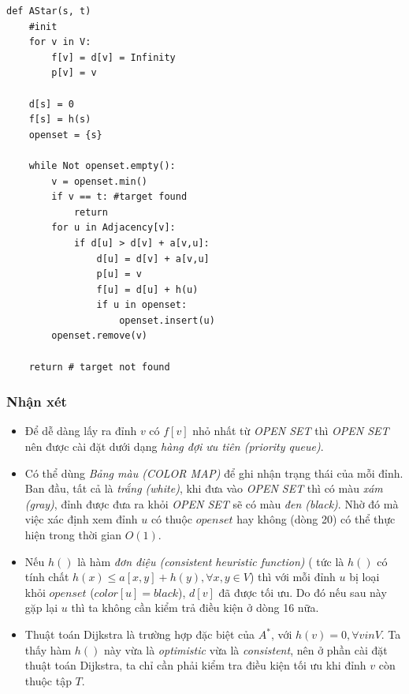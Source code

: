 \documentclass[a4paper,12pt]{report}
\begin{document}
\begin{verbatim}
def AStar(s, t)
    #init
    for v in V:
        f[v] = d[v] = Infinity
        p[v] = v

    d[s] = 0
    f[s] = h(s)
    openset = {s}

    while Not openset.empty():
        v = openset.min()
        if v == t: #target found
            return
        for u in Adjacency[v]:
            if d[u] > d[v] + a[v,u]:
                d[u] = d[v] + a[v,u]
                p[u] = v
                f[u] = d[u] + h(u)
                if u in openset:
                    openset.insert(u)
        openset.remove(v)

    return # target not found
\end{verbatim}

    \subsubsection{Nhận xét}
\begin{itemize}
    \item Để dễ dàng lấy ra đỉnh $v$ có $f[v]$ nhỏ nhất từ \textit{OPEN SET}
        thì \textit{OPEN SET} nên được cài đặt dưới dạng \textit{hàng đợi ưu
        tiên (priority queue)}.
    \item Có thể dùng \textit{Bảng màu (COLOR MAP)} để ghi nhận trạng thái của
        mỗi đỉnh. Ban đầu, tất cả là \textit{trắng (white)}, khi đưa vào
        \textit{OPEN SET} thì có màu \textit{xám (gray)}, đỉnh được đưa ra khỏi
        \textit{OPEN SET} sẽ có màu \textit{đen (black)}. Nhờ đó mà việc xác
        định xem đỉnh $u$ có thuộc $openset$ hay không (dòng 20) có thể thực
        hiện trong thời gian $O(1)$.
    \item Nếu $h()$ là hàm \textit{đơn điệu (consistent heuristic function)} (
        tức là $h()$ có tính chất $h(x) \leq a[x,y] + h(y), \forall x,y \in V$)
        thì với mỗi đỉnh $u$ bị loại khỏi $openset$ ($color[u] = black$),
        $d[v]$ đã được tối ưu. Do đó nếu sau này gặp lại $u$ thì ta không cần
        kiểm trả điều kiện ở dòng 16 nữa.
    \item Thuật toán Dijkstra là trường hợp đặc biệt của $A^{*}$, với $h(v) =
        0, \forall v in V$. Ta thấy hàm $h()$ này vừa là \textit{optimistic}
        vừa là \textit{consistent}, nên ở phần cài đặt thuật toán Dijkstra, ta
        chỉ cần phải kiểm tra điều kiện tối ưu khi đỉnh $v$ còn thuộc tập
        $T$. 
\end{itemize}
\end{document}
